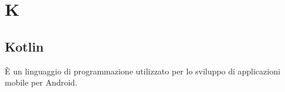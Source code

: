 \section*{K}

\subsection{Kotlin}
È un linguaggio di programmazione utilizzato per lo sviluppo di applicazioni mobile per Android.